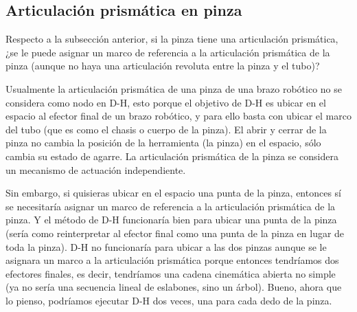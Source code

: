 \subsection{Articulación prismática en pinza}
Respecto a la subsección anterior, si la pinza tiene una articulación prismática, ¿se le puede asignar un marco de referencia a la articulación prismática de la pinza (aunque no haya una articulación revoluta entre la pinza y el tubo)?

Usualmente la articulación prismática de una pinza de una brazo robótico no se considera como nodo en D-H, esto porque el objetivo de D-H es ubicar en el espacio al efector final de un brazo robótico, y para ello basta con ubicar el marco del tubo (que es como el chasis o cuerpo de la pinza). El abrir y cerrar de la pinza no cambia la posición de la herramienta (la pinza) en el espacio, sólo cambia su estado de agarre. La articulación prismática de la pinza se considera un mecanismo de actuación independiente. 

Sin embargo, si quisieras ubicar en el espacio una punta de la pinza, entonces sí se necesitaría asignar un marco de referencia a la articulación prismática de la pinza. Y el método de D-H funcionaría bien para ubicar una punta de la pinza (sería como reinterpretar al efector final como una punta de la pinza en lugar de toda la pinza). D-H no funcionaría para ubicar a las dos pinzas aunque se le asignara un marco a la articulación prismática porque entonces tendríamos dos efectores finales, es decir, tendríamos una cadena cinemática abierta no simple (ya no sería una secuencia lineal de eslabones, sino un árbol). Bueno, ahora que lo pienso, podríamos ejecutar D-H dos veces, una para cada dedo de la pinza. 